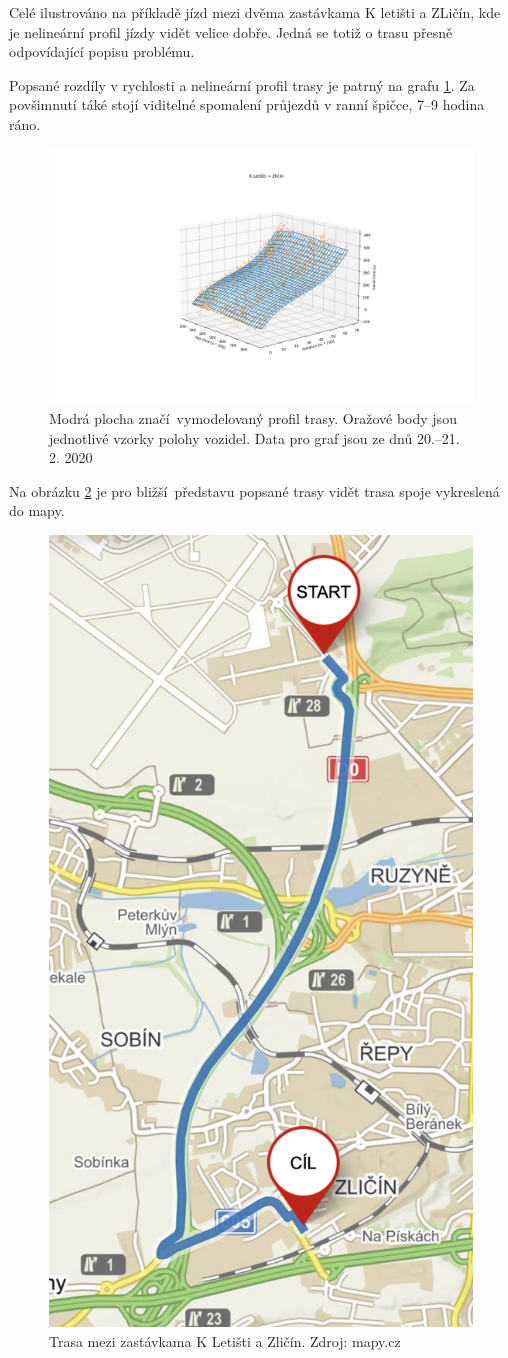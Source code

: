 Celé ilustrováno na příkladě jízd mezi dvěma zastávkama K letišti a ZLičín, kde je nelineární profil jízdy vidět velice dobře. Jedná se totiž o trasu přesně odpovídající popisu problému.

\bigbreak

Popsané rozdíly v rychlosti a nelineární profil trasy je patrný na grafu \ref{fig:k_letisti_to_zlicin_3d}. Za povšimnutí táké stojí viditelné spomalení průjezdů v ranní špičce, 7--9 hodina ráno.

\begin{figure}
  \includegraphics[width=\linewidth]{../img/k_letisti_to_zlicin_3d.png}
  \caption{Modrá plocha značí vymodelovaný profil trasy. Oražové body jsou jednotlivé vzorky polohy vozidel. Data pro graf jsou ze dnů 20.--21. 2. 2020}
  \label{fig:k_letisti_to_zlicin_3d}
\end{figure}

\bigbreak

Na obrázku \ref{fig:k_letisti_to_zlicin_map} je pro bližší představu popsané trasy vidět trasa spoje vykreslená do mapy.

\begin{figure}
	\centering
  \includegraphics[width=0.3\linewidth]{../img/k_letisti_to_zlicin_map.png}
  \caption{Trasa mezi zastávkama K Letišti a Zličín. Zdroj: mapy.cz}
  \label{fig:k_letisti_to_zlicin_map}
\end{figure}

